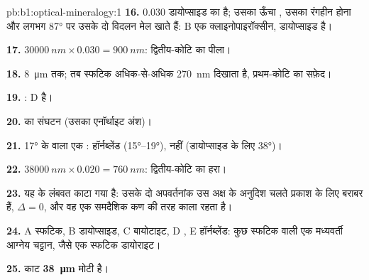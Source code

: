 \begin{solution}{pb:b1:optical-mineralogy:1}
\textbf{16.} $0.030$ डायोप्साइड का  है; उसका ऊँचा , उसका रंगहीन होना और लगभग \ang{87} पर उसके दो विदलन मेल
खाते हैं: B एक क्लाइनोपाइरॉक्सीन, डायोप्साइड है।

\textbf{17.} $\qty{30000}{nm}\times0.030 = \qty{900}{nm}$: द्वितीय-कोटि का पीला।

\textbf{18.} \qty{8}{\micro m} तक; तब स्फटिक अधिक-से-अधिक \qty{270}{nm} दिखाता है, प्रथम-कोटि का सफ़ेद।

\textbf{19.} : D  है।

\textbf{20.}  का संघटन (उसका एनॉर्थाइट अंश)।

\textbf{21.} \ang{17} के  वाला एक : हॉर्नब्लेंड (\ang{15}--\ang{19}),  नहीं (डायोप्साइड के लिए \ang{38})।

\textbf{22.} $\qty{38000}{nm}\times0.020 = \qty{760}{nm}$: द्वितीय-कोटि का हरा।

\textbf{23.} यह  के लंबवत काटा गया है: उसके दो अपवर्तनांक उस अक्ष के अनुदिश चलते प्रकाश के लिए बराबर हैं, $\Delta = 0$,
और वह एक समदैशिक कण की तरह काला रहता है।

\textbf{24.} A स्फटिक, B डायोप्साइड, C बायोटाइट, D , E हॉर्नब्लेंड: कुछ स्फटिक वाली एक मध्यवर्ती आग्नेय चट्टान,
जैसे एक स्फटिक डायोराइट।

\textbf{25.} काट \textbf{\qty[text-series-to-math=true]{38}{\micro m}} मोटी है।
\end{solution}
